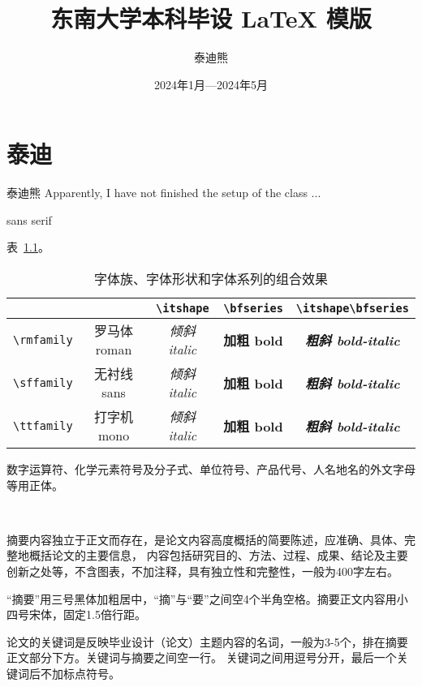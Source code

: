 \documentclass[fontset = mac ms]{seuthesis2024b}
\title{东南大学本科毕设 \LaTeX{} 模版}
\author{泰迪熊}
\date{2024年1月---2024年5月}
\begin{document}
  \maketitle

  \chapter{泰迪}

  泰迪熊 Apparently, I have not finished the setup of the class ...
  
  \textsf{sans serif}

  表~\ref{tab:font-effect}。

  \begin{table}[htbp]
    \centering
    \caption{字体族、字体形状和字体系列的组合效果}
    \label{tab:font-effect}
    \begin{tabular}{c|cccc}
      & & \verb|\itshape| & \verb|\bfseries| & \verb|\itshape\bfseries| \\
      \hline
      \verb|\rmfamily| & \rmfamily 罗马体 roman & \rmfamily\itshape 倾斜 italic & \rmfamily\bfseries 加粗 bold & \rmfamily\itshape\bfseries 粗斜 bold-italic \\
      \verb|\sffamily| & \sffamily 无衬线 sans  & \sffamily\itshape 倾斜 italic & \sffamily\bfseries 加粗 bold & \sffamily\itshape\bfseries 粗斜 bold-italic \\
      \verb|\ttfamily| & \ttfamily 打字机 mono  & \ttfamily\itshape 倾斜 italic & \ttfamily\bfseries 加粗 bold & \ttfamily\itshape\bfseries 粗斜 bold-italic
    \end{tabular}
  \end{table}

  \clearpage

  \noindent
  数字运算符、化学元素符号及分子式、单位符号、产品代号、人名地名的外文字母等用正体。

  ~

  \clearpage

  摘要内容独立于正文而存在，是论文内容高度概括的简要陈述，应准确、具体、完整地概括论文的主要信息，
  内容包括研究目的、方法、过程、成果、结论及主要创新之处等，不含图表，不加注释，具有独立性和完整性，一般为400字左右。

  “摘要”用三号黑体加粗居中，“摘”与“要”之间空4个半角空格。摘要正文内容用小四号宋体，固定1.5倍行距。
  
  论文的关键词是反映毕业设计（论文）主题内容的名词，一般为3-5个，排在摘要正文部分下方。关键词与摘要之间空一行。
  关键词之间用逗号分开，最后一个关键词后不加标点符号。
\end{document}
